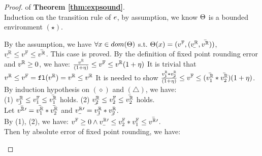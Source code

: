 \documentclass[a4paper,11pt]{article}
\begin{document}
\begin{proof} of \textbf{Theorem \ref{thm:expsound}}.
%
\\
%
Induction on the transition rule of $e$, by assumption, we know $\Theta$ is a bounded environment $(\star)$.
%
	\begin{itemize}
%
	\caseL{
	\[\inferrule*[right = var]
		{
			\trsenv(\varx) 
			= (\fval, ( \ubar{\rval}, \bar{\rval} ))
		}
		{
			\trsenv, \varx
			\trsto
			(\fval, ( \ubar{\rval}, \bar{\rval} ))
		}\]
		}
	By the assumption, we have $\forall x \in dom(\Theta)$ s.t. $\trsenv(\varx) = (\fval, (\ubar{\rval}, \bar{\rval}))$, 
	$\ubar{\rval} \leq \fval \leq \bar{\rval}$.
	This case is proved.
	\caseL{
	\[\inferrule*[right = val]
		{
			\fval = \floaten(\rval)
			\and
			\fval \neq \rval
			\and
			\rval \geq 0
		}
		{
			\trsenv, \rval
			\trsto
			\big(\fval, 
			(\frac{\rval}{(1 + \eta)}, \rval(1 + \eta)) 
			\big)
		}
		\]
	}
	By the definition of fixed point rounding error and $v^{\mathbb{R}} \geq 0$, we have:
	$\frac{v^{\mathbb{R}}}{(1 + \eta)}
	\leq v^{\mathbb{F}} \leq
	v^{\mathbb{R}}(1 + \eta)$
	\caseL{\[
		\inferrule*[right = val-eq]
		{
			\fval = \floaten(\rval)
			~~~~
			\fval = \rval
		}
		{
			\trsenv, \rval
			\trsto
			(\fval, (\rval, \rval) )
		}
	\]}
	It is trivial that $v^{\mathbb{R}} \leq v^{\mathbb{F}} = \mathtt{fl}(v^{\mathbb{R}}) = v^{\mathbb{R}} \leq v^{\mathbb{R}}$
	\caseL{\[
\extend{
	\inferrule*[right = bop]
{
	\trsmem, \expr_1 \trsto 
	(\fval_{1(\ubar{\rval_1}, \bar{\rval_1})})
	~~~~
	\trsmem, \expr_2 \trsto (\fval_{2(\ubar{\rval_2}, \bar{\rval_2})})
	~~~~
	\fval = \floaten(\fval_1 * \fval_2)
}
{
    \trsmem, \expr_1 * \expr_2
    \trsto
    \big(
    (\ubar{\rval_1} * \ubar{\rval_2}) - \eta, 
    (\bar{\rval_1} * \bar{\rval_2} ) + \eta
    \big)
}
}
	\]}
	It is needed to show $\frac{\ubar{\rval_1} * \ubar{\rval_2}}{(1 + \eta)}
	\leq \fval \leq 
	(\bar{\rval_1} * \bar{\rval_2})(1 + \eta)$.\\
	By induction hypothesis on $(\diamond)$ and $(\triangle)$, we have:\\
	(1) $\ubar{\rval_1} \leq \fval_1 \leq \bar{\rval_1}$ holds. 
	(2) $\ubar{\rval_2} \leq \fval_2 \leq \bar{\rval_2}$ holds.\\
	Let $\bar{v^{\mathbb{R}}{'}} = 
	\bar{v^{\mathbb{R}}_1} * \bar{v^{\mathbb{R}}_2}$ and 
	$\ubar{\rval{'}} = \ubar{\rval_1} * \ubar{\rval_2}$.
	\\
	By (1), (2), we have:
	$\fval \geq 0
	\land
	\ubar{\rval{'}}
	\leq \fval_2 \bop \fval_1
	\leq \bar{\rval{'}}$.\\
	Then by absolute error of fixed point rounding, we have:\\

\end{itemize}
\end{proof}
\end{document}

